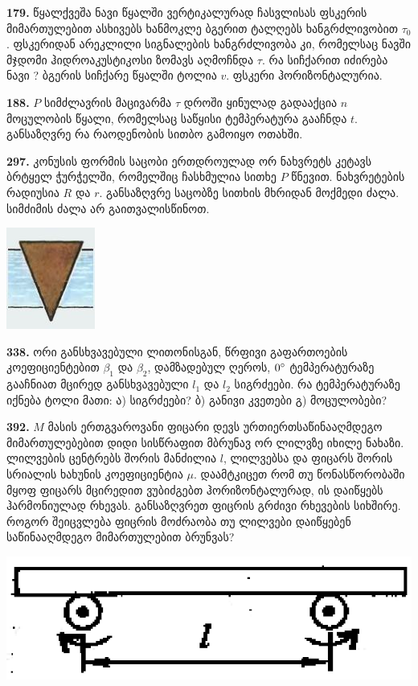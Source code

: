 \documentclass[12pt,a4paper,]{report}
\begin{document}
\textbf{179.} წყალქვეშა ნავი წყალში ვერტიკალურად ჩასვლისას ფსკერის მიმართულებით ასხივებს ხანმოკლე ბგერით ტალღებს ხანგრძლივობით $\tau_0$. ფსკერიდან არეკლილი სიგნალების ხანგრძლივობა კი, რომელსაც ნავში მჯდომი ჰიდროაკუსტიკოსი ზომავს აღმოჩნდა $\tau$. რა სიჩქარით იძირება ნავი ? ბგერის სიჩქარე წყალში ტოლია $v$. ფსკერი ჰორიზონტალურია.

\textbf{188.} $P$ სიმძლავრის მაცივარმა $\tau$ დროში ყინულად გადააქცია $n$ მოცულობის წყალი, რომელსაც საწყისი ტემპერატურა გააჩნდა $t$. განსაზღვრე რა რაოდენობის სითბო გამოიყო ოთახში.
 
\textbf{297.} კონუსის ფორმის საცობი ერთდროულად ორ ნახვრეტს კეტავს ბრტყელ ჭურჭელში, რომელშიც ჩასხმულია სითხე $P$ წნევით.  ნახვრეტების რადიუსია $R$ და $r$. განსაზღვრე საცობზე სითხის მხრიდან მოქმედი ძალა. სიმძიმის ძალა არ გაითვალისწინოთ.
		\begin{center}
			\includegraphics[scale=0.5]{images/F297.jpg}
		\end{center}

\textbf{338.} ორი განსხვავებული ლითონისგან, წრფივი გაფართოების კოეფიციენტებით $\beta_1$ და $\beta_2$, დამზადებულ ღეროს, $0\degree$ ტემპერატურაზე გააჩნიათ მცირედ განსხვავებული $l_1$ და $l_2$ სიგრძეები. რა ტემპერატურაზე იქნება ტოლი მათი: ა) სიგრძეები? ბ) განივი კვეთები გ) მოცულობები?

\textbf{392.} $M$ მასის ერთგვაროვანი ფიცარი დევს ურთიერთსაწინააღმდეგო მიმართულებებით დიდი სისწრაფით მბრუნავ ორ ლილვზე იხილე ნახაზი. ლილვების ცენტრებს შორის მანძილია $l$, ლილვებსა და ფიცარს შორის სრიალის ხახუნის კოეფიციენტია $\mu$. დაამტკიცეთ რომ თუ წონასწორობაში მყოფ ფიცარს მცირედით ვუბიძგებთ ჰორიზონტალურად, ის დაიწყებს ჰარმონიულად რხევას. განსაზღვრეთ ფიცრის გრძივი რხევების სიხშირე. როგორ შეიცვლება ფიცრის მოძრაობა თუ ლილვები დაიწყებენ საწინააღმდეგო მიმართულებით ბრუნვას?
	\begin{center}
		\includegraphics[scale=0.4]{images/392}
	\end{center}
\end{document}
